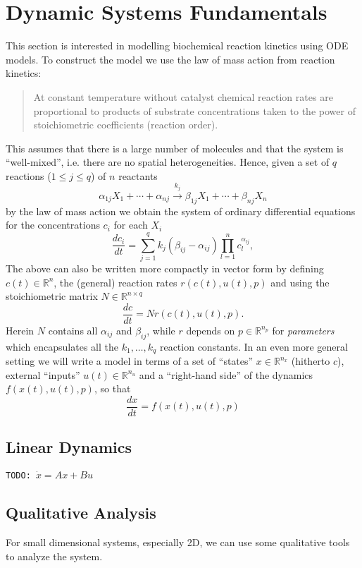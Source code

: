 \documentclass[a4paper]{article}
\newcommand{\todo}[1]{\texttt{TODO: #1}}
\theoremstyle{plain}
\theoremstyle{definition}
\theoremstyle{remark}
\begin{document}
\section{Dynamic Systems Fundamentals}

This section is interested in modelling biochemical reaction kinetics using
ODE models. To construct the model we use the law of mass action from reaction
kinetics:
\begin{quote}
  At constant temperature without catalyst chemical reaction rates are
  proportional to products of substrate concentrations taken to the power of
  stoichiometric coefficients (reaction order).
\end{quote}
This assumes that there is a large number of molecules and that the system is
``well-mixed'', i.e. there are no spatial heterogeneities. Hence, given a
set of $q$ reactions ($1 \leq j \leq q$) of $n$ reactants
\[
  \alpha_{1j} X_1 + \cdots + \alpha_{nj}
  \stackrel{k_j}{\longrightarrow}
  \beta_{1j} X_1 + \cdots + \beta_{nj} X_n
\]
by the law of mass action we obtain the system of ordinary differential
equations for the concentrations $c_i$ for each $X_i$
\[
  \frac{dc_i}{dt} = \sum_{j=1}^q k_j (\beta_{ij} - \alpha_{ij})
    \prod_{l=1}^n c_l^{\alpha_{lj}},
\]
The above can also be written more compactly in vector form by defining $c(t)
\in \mathbb{R}^{n}$, the (general) reaction rates $r(c(t), u(t), p)$ and using
the stoichiometric matrix $N \in \mathbb{R}^{n \times q}$
\[
  \frac{dc}{dt} = N r(c(t), u(t), p).
\]
Herein $N$ contains all $\alpha_{ij}$ and $\beta_{ij}$, while $r$ depends on
$p \in \mathbb{R}^{n_p}$ for \emph{parameters} which encapsulates all the
$k_1, \ldots, k_q$ reaction constants. In an even more general setting we will
write a model in terms of a set of ``states'' $x \in \mathbb{R}^{n_x}$
(hitherto $c$), external ``inputs'' $u(t) \in \mathbb{R}^{n_u}$ and a
``right-hand side'' of the dynamics $f(x(t), u(t), p)$, so that
\[
  \frac{dx}{dt} = f(x(t), u(t), p)
\]

\subsection{Linear Dynamics}

\todo{$\dot{x} = Ax + Bu$}

\subsection{Qualitative Analysis}

For small dimensional systems, especially 2D, we can use some qualitative
tools to analyze the system.
\end{document}
